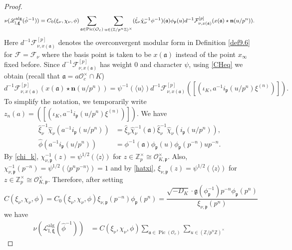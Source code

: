 \documentclass[a4paper,11pt]{amsart}
\numberwithin{equation}{section}
\theoremstyle{plain}
\theoremstyle{definition}
\theoremstyle{remark}
\newcommand{\Z}{\mathbb Z}
\newcommand{\I}{\mathbb{I}}
\DeclareMathOperator{\Pic}{Pic}
\begin{document}
\begin{proof}
\begin{equation*}
\footnotesize
{\nu(\mathscr{L}^\mathrm{alg}_{\I,\boldsymbol{\xi}}(\hat{\phi}^{-1})) =
C_0(\xi_\nu,\chi_\nu,\phi)\sum_{\mathfrak{a}\in \Pic({\mathcal{O}_c})} \sum_{u \in (\Z/p^n\Z)^\times}
(\hat{\xi}_\nu\hat{\chi}^{-1}_\nu\phi^{-1})(\mathfrak{a})
\phi_\mathfrak{p}(u)d^{-1}\mathcal{F}_{\nu ,x(\mathfrak{a})}^{[p]}(x(\mathfrak{a})\star \mathbf{n}(u/p^n)).
}
\end{equation*}
Here $d^{-1}\mathcal{F}_{\nu ,x(\mathfrak{a})}^{[p]}$ denotes the overconvergent modular form in Definition \ref{def9.6} for $\mathcal{F}=\mathcal{F}_\nu$ where the basis point is taken to be $x(\mathfrak{a})$ instead of the point $x_\infty$ fixed before. 
Since $d^{-1}\mathcal{F}_{\nu ,x(\mathfrak{a})}^{[p]}$ has weight $0$ and character $\psi$, using \eqref{CHeq} we obtain 
(recall that $\mathfrak{a}=a\mathcal{O}_c^\times\cap K$) 
\[d^{-1}\mathcal{F}_{\nu , x(\mathfrak{a})}^{[p]}(x(\mathfrak{a})\star \mathbf{n}(u/p^n)) = \psi^{-1}(\langle u\rangle)d^{-1}\mathcal{F}_{\nu ,x(\mathfrak{a})}^{[p]}
\left(\left[\left(\iota_K,a^{-1}i_\mathfrak{p}(u/p^n)\xi^{(n)}\right)\right]\right).\]
To simplify the notation, we temporarily write 
$z_n(a)=\left(\left[\left(\iota_K,a^{-1}i_\mathfrak{p}(u/p^n)\xi^{(n)}\right)\right]\right).$
We have  
\[
\begin{split}
\hat{\xi}_\nu^{-1}\hat{\chi}_\nu(a^{-1}i_{\mathfrak{p}}(u/p^n)) &= 
\hat{\xi}_\nu\hat{\chi}_\nu^{-1}(\mathfrak{a})\hat{\xi}_\nu^{-1} \hat{\chi}_\nu(i_{\mathfrak{p}}(u/p^{n})),\\
\hat{\phi}(a^{-1}i_{\mathfrak{p}}(u/p^{n})) &= \phi^{-1}(\mathfrak{a})\phi_{\mathfrak{p}}(u)\phi_{\mathfrak{p}}(p^{-n})up^{-n}.
\end{split}
\]
By \eqref{chi_k}, 
$\chi_{\nu, \mathfrak{p}}^{-1}(z)=\psi^{1/2}(\langle z \rangle) $
for $z \in \Z_p^\times \cong \mathcal{O}_{K,\mathfrak{p}}^\times$. Also, $
{\chi}_{\nu,\mathfrak{p}}^{-1}(p^{-n})= \psi^{1/2}(\langle p^np^{-n}\rangle)=1$ 
and by \eqref{hatxi}, $\xi_{\nu,\mathfrak{p}}(z)=\psi^{1/2}(\langle z \rangle)$ for $z \in \Z_p^\times \cong \mathcal{O}_{K,\mathfrak{p}}^\times$.
Therefore, after setting 
\[C(\xi_\nu,\chi_\nu,\phi)=C_0(\xi_\nu,\chi_\nu,\phi) \xi_{\nu,\mathfrak{p}}(p^{-n})\phi_\mathfrak{p}(p^n)=
\frac{\sqrt{-D_K}\cdot\mathfrak{g}(\phi^{-1}_\mathfrak{p})p^{-n}\phi_{\mathfrak{p}}(p^n)}
{\xi_{\nu,\mathfrak{p}}(p^n)}
\]
we have 
\[\begin{split}
\nu(\mathscr{L}^\mathrm{alg}_{\I,\boldsymbol{\xi}}(\hat{\phi}^{-1})) &=
C(\xi_\nu,\chi_\nu,\phi)
\sum_{\mathfrak{a}\in \Pic({\mathcal{O}_c})} \sum_{u \in (\Z/p^n\Z)^\times}

\end{split}\]
\end{proof}
\end{document}
